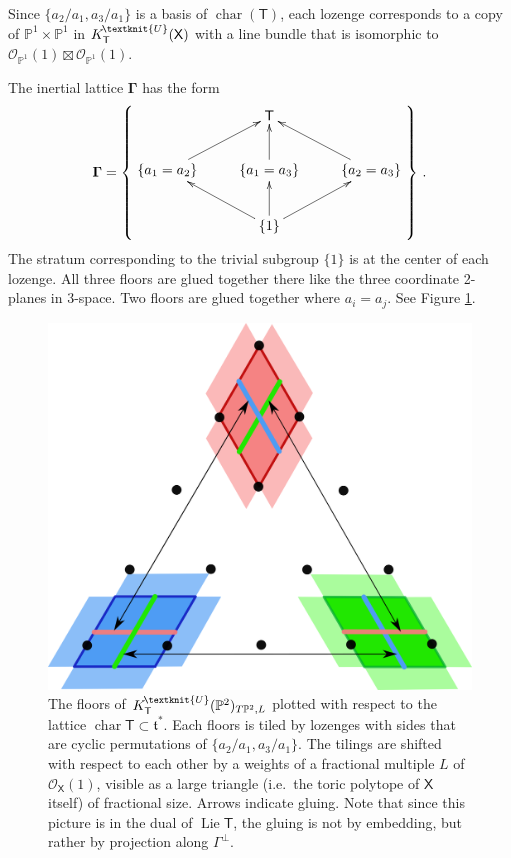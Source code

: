 \documentclass[14pt]{extarticle}
\newcommand{\Kn}{K^{\! \tiny\textknit{U}}}
\newcommand{\bT}{\mathsf{T}}
\newcommand{\bX}{\mathsf{X}}
\newcommand{\bP}{\mathbb{P}}
\newcommand{\bGamma}{\boldsymbol{\Gamma}}
\newcommand{\ft}{\mathfrak{t}}
\newcommand{\cO}{\mathscr{O}}
\DeclareMathOperator{\Lie}{Lie}
\DeclareMathOperator{\chr}{char}
\theoremstyle{definition}
\begin{document}
Since $\{a_2/a_1,a_3/a_1\}$ is a basis of $\chr(\bT)$, each lozenge corresponds to a copy of $\bP^1 \times
\bP^1$ in $\Kn_{\bT}(\bX)$ with a line bundle that is
isomorphic to $\cO_{\bP^1}(1) \boxtimes \cO_{\bP^1}(1)$. 

The inertial lattice $\bGamma$ has the form 
$$
\bGamma = \left\{ \raisebox{1.5cm}{\xymatrix{
 & \bT \\
  \{a_1=a_2\}  \ar[ur] &  \{a_1=a_3\} \ar[u]  &  \{a_2=a_3\} \ar[ul]\\
 & \{1\} \ar[ul] \ar[u] \ar[ur] 
} }\right\} \,. 
$$
The stratum corresponding to the trivial subgroup $\{1\}$ is at the
center of each lozenge. All three floors are glued together there like
the three coordinate 2-planes in 3-space. Two
floors are glued together where $a_i=a_j$. See Figure
\ref{ftriangle}. 

\begin{figure}[!h]
  \centering
  \includegraphics[scale=0.16]{triangle3.png}
 \caption{The floors of $\Kn_{\bT}(\bP^2)_{T\bP^2,L}$ plotted with
   respect to 
   the lattice $\chr \bT\subset \ft^*$. Each floors is tiled by lozenges with sides
   that are cyclic permutations of  $\{a_2/a_1,a_3/a_1\}$. The tilings
   are shifted with respect to each other by a weights of a fractional
   multiple $L$ of $\cO_{\bX}(1)$, visible as a large triangle (i.e.\ the
   toric polytope of $\bX$ itself) of
   fractional size. Arrows indicate gluing. Note that since this
   picture is in the dual of $\Lie \bT$, the gluing is not by
   embedding, but rather by projection along $\Gamma^\perp$. 
   }
\label{ftriangle}
\end{figure}
\end{document}
